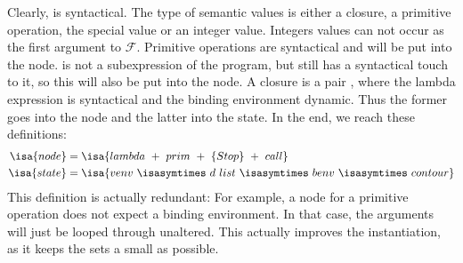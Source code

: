 \documentclass[a4paper,halfparskip,DIV=10,11pt]{scrbook}
\newcommand{\F}{\mathcal F}
\begin{document}
Clearly,  is syntactical. The type  of semantic values is either a closure, a primitive operation, the special value  or an integer value. Integers values can not occur as the first argument to $\F$. Primitive operations are syntactical and will be put into the node.  is not a subexpression of the program, but still has a syntactical touch to it, so this will also be put into the node. A closure is a pair , where the lambda expression is syntactical and the binding environment dynamic. Thus the former goes into the node and the latter into the state. In the end, we reach these definitions:
\begin{align*}
\isa{node} &= \isa{lambda\ +\ prim\ +\ \{Stop\}\ +\ call} \\
\isa{state} &= \isa{venv\ \isasymtimes\ d\ list\ \isasymtimes\ benv\ \isasymtimes\ contour}
\end{align*}
This definition is actually redundant: For example, a node for a primitive operation does not expect a binding environment. In that case, the arguments will just be looped through unaltered. This actually improves the instantiation, as it keeps the  sets a small as possible.
\end{document}
